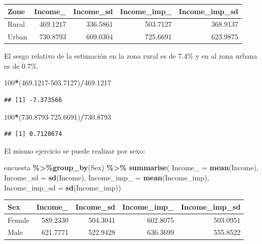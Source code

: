 \documentclass[
  12pt,
]{book}
\newenvironment{Shaded}{\begin{snugshade}}{\end{snugshade}}
\newcommand{\AttributeTok}[1]{\textcolor[rgb]{0.13,0.29,0.53}{#1}}
\newcommand{\DecValTok}[1]{\textcolor[rgb]{0.00,0.00,0.81}{#1}}
\newcommand{\FloatTok}[1]{\textcolor[rgb]{0.00,0.00,0.81}{#1}}
\newcommand{\FunctionTok}[1]{\textcolor[rgb]{0.13,0.29,0.53}{\textbf{#1}}}
\newcommand{\NormalTok}[1]{#1}
\newcommand{\SpecialCharTok}[1]{\textcolor[rgb]{0.81,0.36,0.00}{\textbf{#1}}}
\begin{document}
\begin{tabular}{l|r|r|r|r}
\hline
Zone & Income\_ & Income\_sd & Income\_imp\_ & Income\_imp\_sd\\
\hline
Rural & 469.1217 & 336.5861 & 503.7127 & 368.9137\\
\hline
Urban & 730.8793 & 609.0304 & 725.6691 & 623.9875\\
\hline
\end{tabular}

El sesgo relativo de la estimación en la zona rural es de 7.4\% y en al zona urbana es de 0.7\%.

\begin{Shaded}
\begin{Highlighting}[]
\DecValTok{100}\SpecialCharTok{*}\NormalTok{(}\FloatTok{469.1217{-}503.7127}\NormalTok{)}\SpecialCharTok{/}\FloatTok{469.1217}
\end{Highlighting}
\end{Shaded}

\begin{verbatim}
## [1] -7.373566
\end{verbatim}

\begin{Shaded}
\begin{Highlighting}[]
\DecValTok{100}\SpecialCharTok{*}\NormalTok{(}\FloatTok{730.8793{-}725.6691}\NormalTok{)}\SpecialCharTok{/}\FloatTok{730.8793}
\end{Highlighting}
\end{Shaded}

\begin{verbatim}
## [1] 0.7128674
\end{verbatim}

El mismo ejercicio se puede realizar por sexo:

\begin{Shaded}
\begin{Highlighting}[]
\NormalTok{encuesta }\SpecialCharTok{\%\textgreater{}\%}\FunctionTok{group\_by}\NormalTok{(Sex) }\SpecialCharTok{\%\textgreater{}\%}  \FunctionTok{summarise}\NormalTok{(}
  \AttributeTok{Income\_ =} \FunctionTok{mean}\NormalTok{(Income),}
  \AttributeTok{Income\_sd =} \FunctionTok{sd}\NormalTok{(Income),}
  \AttributeTok{Income\_imp\_ =} \FunctionTok{mean}\NormalTok{(Income\_imp),}
  \AttributeTok{Income\_imp\_sd =} \FunctionTok{sd}\NormalTok{(Income\_imp))}
\end{Highlighting}
\end{Shaded}

\begin{tabular}{l|r|r|r|r}
\hline
Sex & Income\_ & Income\_sd & Income\_imp\_ & Income\_imp\_sd\\
\hline
Female & 589.2330 & 504.3041 & 602.8075 & 503.0951\\
\hline
Male & 621.7771 & 522.9428 & 636.3699 & 555.8522\\
\hline
\end{tabular}
\end{document}

